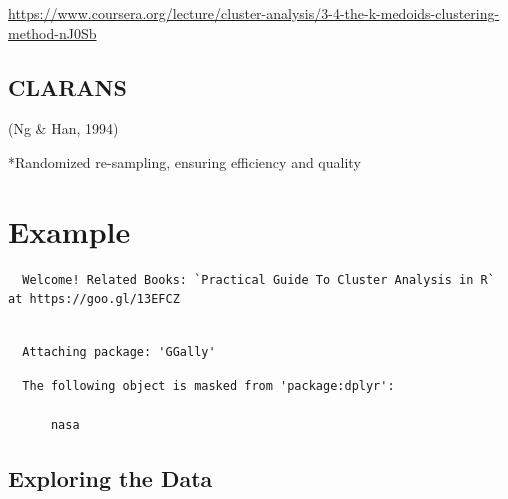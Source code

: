 \documentclass[12pt,twoside]{amherstthesis}
\begin{document}
  \url{https://www.coursera.org/lecture/cluster-analysis/3-4-the-k-medoids-clustering-method-nJ0Sb}
  
  \section{CLARANS}\label{clarans}
  
  (Ng \& Han, 1994)
  
  *Randomized re-sampling, ensuring efficiency and quality
  
  \chapter{Example}\label{typeset-equ}
  
  \begin{Shaded}
  \begin{Highlighting}[]
  \end{Highlighting}
  \end{Shaded}
  
  \begin{verbatim}
  Welcome! Related Books: `Practical Guide To Cluster Analysis in R` at https://goo.gl/13EFCZ
  \end{verbatim}
  
  \begin{Shaded}
  \begin{Highlighting}[]
  \end{Highlighting}
  \end{Shaded}
  
  \begin{verbatim}
  
  Attaching package: 'GGally'
  \end{verbatim}
  
  \begin{verbatim}
  The following object is masked from 'package:dplyr':
  
      nasa
  \end{verbatim}
  
  \section{Exploring the Data}\label{exploring-the-data}
  
\end{document}
